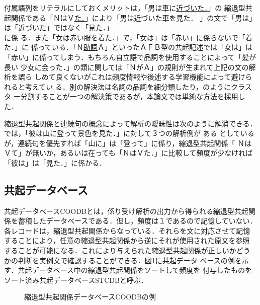 付属語列をリテラルにしておくメリットは，「男は車に\underline{近づいた．}」の
縮退型共起関係である「ＮはＶ\underline{た．}」\hspace*{-1mm}により「男は近づいた車を見た．
」\hspace*{-1mm}の文で「男は」\hspace*{-1mm}は\hspace*{-1mm}「近づい\underline{た}」\hspace*{-1mm}ではなく\hspace*{-1mm}「見\underline{た．}」\\に係
る．また「女は赤い服を着た．」で，「女は」は「赤い」に係らないで「着た．」に
係っている．「Ｎ\underline{助詞}Ａ」といったＡＦＢ型の共起記述では「女は」は
「赤い」に係ってしまう．もちろん自立語で品詞を使用することによって「髪が長い
少女に会った．」の類に関しては「ＮがＡ」の規則が生まれて上記の文の解析を誤ら
しめて良くないがこれは頻度情報や後述する学習機能によって避けられると考えてい
る．別の解決法は名詞の品詞を細分類したり，\cite{Shirai1986}のようにクラスタ
ー分割することが一つの解決策であるが，本論文では単純な方法を採用した．

縮退型共起関係と連続句の概念によって解析の曖昧性は次のように解消できる．
\cite{Yoshida1972}では，「彼は山に登って景色を見た．」に対して３つの解析例が
ある
としているが，連続句を優先すれば「山に」は「登って」に係り，縮退型共起関係「
ＮはＶて」が無いか，あるいは在っても「ＮはＶた．」に比較して頻度が少なければ
「彼は」は「見た．」に係かる．

\subsection{共起データベース}

共起データベースCOODBとは，係り受け解析の出力から得られる縮退型共起関
係を蓄積したデータベースである．但し，頻度は１であるので記憶していない．
各レコードは，縮退型共起関係からなっている．それらを文に対応させて記憶
することにより，任意の縮退型共起関係から逆にそれが使用された原文を参照
することが可能になる．これにより与えられた縮退型共起関係が正しいかどう
かの判断を実例文で確認することができる．図\ref{COODBの例}に共起データ
ベースの例を示す．共起データベース中の縮退型共起関係をソートして頻度を
付与したものをソート済み共起データベースSTCDBと呼ぶ．
\vspace*{3mm}

\begin{figure} [htb]
\begin{center}
\caption{縮退型共起関係データベースCOODBの例}
\label{COODBの例}
\end{center}
\end{figure}

